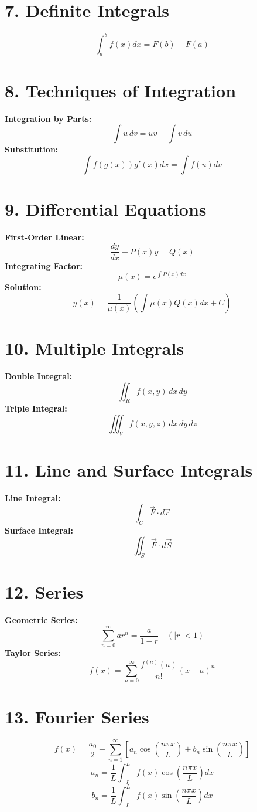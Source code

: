 \documentclass[fleqn]{article}
\begin{document}
\begin{multicols}{2}
\section*{7. Definite Integrals}
\[
\int_a^b f(x) dx = F(b) - F(a)
\]

\section*{8. Techniques of Integration}
\textbf{Integration by Parts:}
\[
\int u \, dv = uv - \int v \, du
\]
\textbf{Substitution:}
\[
\int f(g(x))g'(x) dx = \int f(u) du
\]

\section*{9. Differential Equations}
\textbf{First-Order Linear:}
\[
\frac{dy}{dx} + P(x)y = Q(x)
\]
\textbf{Integrating Factor:}
\[
\mu(x) = e^{\int P(x) dx}
\]
\textbf{Solution:}
\[
y(x) = \frac{1}{\mu(x)} \left( \int \mu(x) Q(x) dx + C \right)
\]

\section*{10. Multiple Integrals}
\textbf{Double Integral:}
\[
\iint_R f(x, y) \, dx \, dy
\]
\textbf{Triple Integral:}
\[
\iiint_V f(x, y, z) \, dx \, dy \, dz
\]

\section*{11. Line and Surface Integrals}
\textbf{Line Integral:}
\[
\int_C \vec{F} \cdot d\vec{r}
\]
\textbf{Surface Integral:}
\[
\iint_S \vec{F} \cdot d\vec{S}
\]

\section*{12. Series}
\textbf{Geometric Series:}
\[
\sum_{n=0}^{\infty} ar^n = \frac{a}{1 - r} \quad (|r| < 1)
\]
\textbf{Taylor Series:}
\[
f(x) = \sum_{n=0}^{\infty} \frac{f^{(n)}(a)}{n!}(x - a)^n
\]

\section*{13. Fourier Series}
\[
f(x) = \frac{a_0}{2} + \sum_{n=1}^{\infty} \left[ a_n \cos\left( \frac{n\pi x}{L} \right) + b_n \sin\left( \frac{n\pi x}{L} \right) \right]
\]
\[
a_n = \frac{1}{L} \int_{-L}^{L} f(x) \cos\left( \frac{n\pi x}{L} \right) dx
\]
\[
b_n = \frac{1}{L} \int_{-L}^{L} f(x) \sin\left( \frac{n\pi x}{L} \right) dx
\]


\end{multicols}
\end{document}
